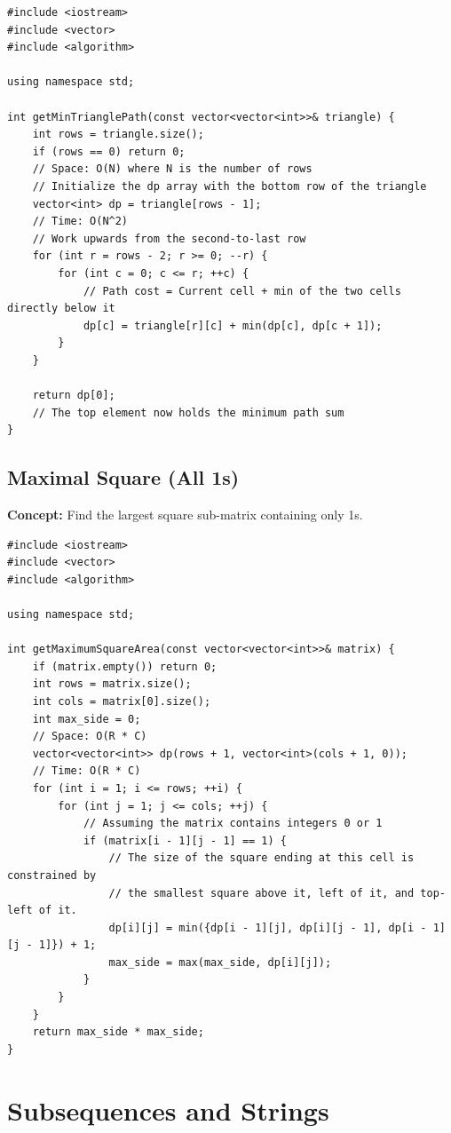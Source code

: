 \begin{lstlisting}
#include <iostream>
#include <vector>
#include <algorithm>

using namespace std;

int getMinTrianglePath(const vector<vector<int>>& triangle) {
    int rows = triangle.size();
    if (rows == 0) return 0;
    // Space: O(N) where N is the number of rows
    // Initialize the dp array with the bottom row of the triangle
    vector<int> dp = triangle[rows - 1];
    // Time: O(N^2)
    // Work upwards from the second-to-last row
    for (int r = rows - 2; r >= 0; --r) {
        for (int c = 0; c <= r; ++c) {
            // Path cost = Current cell + min of the two cells directly below it
            dp[c] = triangle[r][c] + min(dp[c], dp[c + 1]);
        }
    }
    
    return dp[0];
    // The top element now holds the minimum path sum
}
\end{lstlisting}

\subsection{Maximal Square (All 1s)}
\textbf{Concept:} Find the largest square sub-matrix containing only 1s.

\begin{lstlisting}
#include <iostream>
#include <vector>
#include <algorithm>

using namespace std;

int getMaximumSquareArea(const vector<vector<int>>& matrix) {
    if (matrix.empty()) return 0;
    int rows = matrix.size();
    int cols = matrix[0].size();
    int max_side = 0;
    // Space: O(R * C)
    vector<vector<int>> dp(rows + 1, vector<int>(cols + 1, 0));
    // Time: O(R * C)
    for (int i = 1; i <= rows; ++i) {
        for (int j = 1; j <= cols; ++j) {
            // Assuming the matrix contains integers 0 or 1
            if (matrix[i - 1][j - 1] == 1) {
                // The size of the square ending at this cell is constrained by 
                // the smallest square above it, left of it, and top-left of it.
                dp[i][j] = min({dp[i - 1][j], dp[i][j - 1], dp[i - 1][j - 1]}) + 1;
                max_side = max(max_side, dp[i][j]);
            }
        }
    }
    return max_side * max_side;
}
\end{lstlisting}


\section{Subsequences and Strings}

